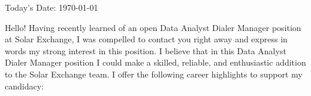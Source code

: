 \documentclass[8pt,a4paper,ragged2e,withhyper]{altacv}
\begin{document}
\hspace{.25cm}

\makecvheader


\newcommand{\empName}{Solar Exchange}
\newcommand{\jobName}{Data Analyst Dialer Manager}
\newcommand{\jobType}{position}

\begin{changemargin}{0.5cm}{0.7cm}
\large{Today's Date: \today}

\medskip
\medskip
\normalsize
\color{black}
\setlength{\parindent}{1.5em}
\setlength{\parskip}{0.75em}
\setlength{\line}{}

Hello! Having recently learned of an open \jobName{} \jobType{} at \empName{}, I was compelled to contact you right away and express in words my strong interest in this position. I believe that in this \jobName{} \jobType{} I could make a skilled, reliable, and enthusiastic addition to the \empName{} team. I offer the following career highlights to support my candidacy:

\begin{itemize}


\end{itemize}
\end{changemargin}
\end{document}
